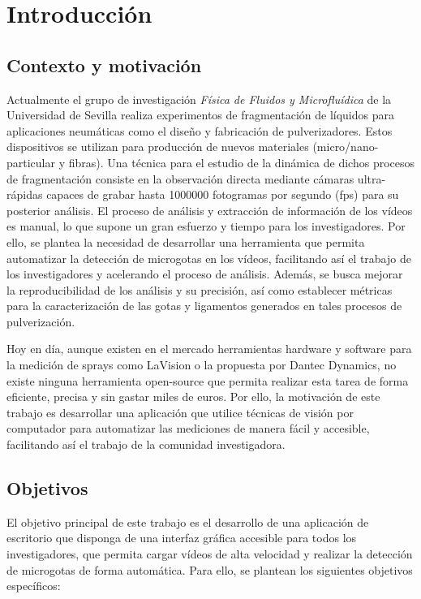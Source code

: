 
\chapter{Introducción}\label{cap:introduccion}

\section{Contexto y motivación}

Actualmente el grupo de investigación \textit{Física de Fluidos y Microfluídica} de la Universidad de Sevilla realiza experimentos de fragmentación de líquidos para aplicaciones neumáticas como el diseño y fabricación de pulverizadores. Estos dispositivos se utilizan para producción de nuevos materiales (micro/nano-particular y fibras). Una técnica para el estudio de la dinámica de dichos procesos de fragmentación consiste en la observación directa mediante cámaras ultra-rápidas capaces de grabar hasta 1000000 fotogramas por segundo (fps) para su posterior análisis. El proceso de análisis y extracción de información de los vídeos es manual, lo que supone un gran esfuerzo y tiempo para los investigadores. Por ello, se plantea la necesidad de desarrollar una herramienta que permita automatizar la detección de microgotas en los vídeos, facilitando así el trabajo de los investigadores y acelerando el proceso de análisis. Además, se busca mejorar la reproducibilidad de los análisis y su precisión, así como establecer métricas para la caracterización de las gotas y ligamentos generados en tales procesos de pulverización.

Hoy en día, aunque existen en el mercado herramientas hardware y software para la medición de sprays como LaVision\cite{lavision_spraymaster} o la propuesta por Dantec Dynamics\cite{dantec_shadowsizer}, no existe ninguna herramienta open-source que permita realizar esta tarea de forma eficiente, precisa y sin gastar miles de euros. Por ello, la motivación de este trabajo es desarrollar una aplicación que utilice técnicas de visión por computador para automatizar las mediciones de manera fácil y accesible, facilitando así el trabajo de la comunidad investigadora.

\section{Objetivos}

El objetivo principal de este trabajo es el desarrollo de una aplicación de escritorio que disponga de una interfaz gráfica accesible para todos los investigadores, que permita cargar vídeos de alta velocidad y realizar la detección de microgotas de forma automática. Para ello, se plantean los siguientes objetivos específicos:

